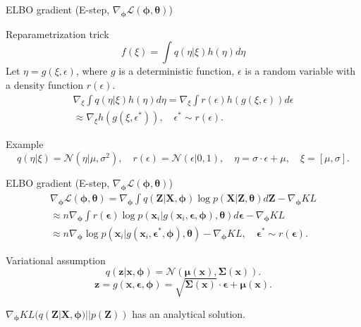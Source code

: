 \documentclass{beamer}
\newcommand{\bx}{\mathbf{x}}
\newcommand{\bz}{\mathbf{z}}
\newcommand{\bX}{\mathbf{X}}
\newcommand{\bZ}{\mathbf{Z}}
\newcommand{\bepsilon}{\boldsymbol{\epsilon}}
\newcommand{\bmu}{\boldsymbol{\mu}}
\newcommand{\bphi}{\boldsymbol{\phi}}
\newcommand{\bSigma}{\boldsymbol{\Sigma}}
\newcommand{\btheta}{\boldsymbol{\theta}}
\begin{document}
\begin{frame}{ELBO gradient (E-step, $\nabla_{\bphi} \mathcal{L}(\bphi, \btheta)$)}
\begin{block}{Reparametrization trick}
\vspace{-0.3cm}
\[
	f(\xi) = \int q(\eta|\xi) h(\eta) d\eta
\]
Let $\eta = g(\xi, \epsilon)$, where $g$ is a deterministic function, $\epsilon$ is a random variable with a density function $r(\epsilon)$.
\begin{multline*}
\nabla_\xi \int q(\eta|\xi) h(\eta) d\eta = \nabla_\xi \int r(\epsilon) h(g(\xi, \epsilon)) d \epsilon \\
\approx \nabla_\xi h(g(\xi, \epsilon^*)), \quad \epsilon^* \sim r(\epsilon).
\end{multline*}
\end{block}
\vspace{-0.1cm}
\begin{block}{Example}
\vspace{-0.3cm}
\[
	q(\eta|\xi) = \mathcal{N}(\eta| \mu, \sigma^2), \quad r(\epsilon) = \mathcal{N}(\epsilon|0, 1), \quad \eta = \sigma \cdot \epsilon + \mu, \quad \xi = [\mu, \sigma].
\]
\end{block}
\end{frame}
\begin{frame}{ELBO gradient (E-step, $\nabla_{\bphi} \mathcal{L}(\bphi, \btheta)$)}
	\vspace{-0.3cm}
	\begin{multline*}
		\nabla_{\bphi} \mathcal{L} (\bphi, \btheta) = \nabla_{\bphi}\int q(\bZ|\bX, \bphi) \log p(\bX| \bZ, \btheta)d\bZ  - \nabla_{\bphi} KL \\ \approx  n \nabla_{\bphi}\int r(\bepsilon) \log p(\bx_i| g(\bx_i, \bepsilon, \bphi), \btheta)d\bepsilon  - \nabla_{\bphi} KL  \\ \approx
		n \nabla_{\bphi} \log p(\bx_i| g(\bx_i, \bepsilon^*, \bphi), \btheta)  - \nabla_{\bphi} KL , \quad \bepsilon^* \sim r(\bepsilon).
	\end{multline*}
	
	\begin{block}{Variational assumption}
	\[
	q(\bz| \bx, \bphi) = \mathcal{N} (\bmu(\bx), \boldsymbol{\Sigma}(\bx)).
	\]
	\[
		\bz = g(\bx, \bepsilon, \bphi) = \sqrt{\bSigma(\bx)} \cdot \bepsilon + \bmu(\bx).
	\]
	\end{block}
	$\nabla_{\bphi} KL (q(\bZ | \bX, \bphi) || p(\bZ))$ has an analytical solution.
\end{frame}
\end{document}
